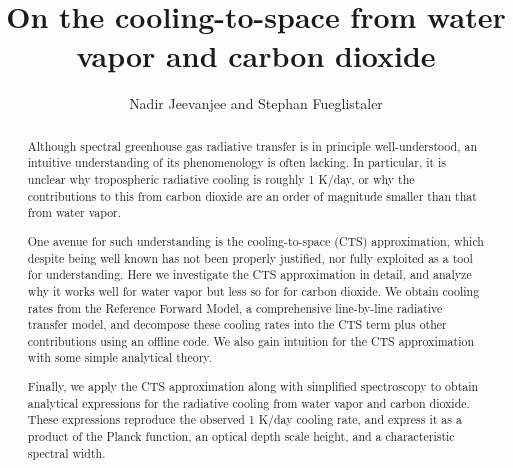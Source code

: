 \documentclass[10pt]{article}
\begin{document}
%
%


\title{On the cooling-to-space from water vapor and carbon dioxide}

%
%


 \author{Nadir Jeevanjee and Stephan Fueglistaler}

\maketitle

\begin{abstract}
Although spectral greenhouse gas radiative transfer is in principle well-understood, an intuitive understanding of its phenomenology is often lacking. In particular, it is unclear why tropospheric radiative cooling is roughly 1 K/day, or why the contributions to this from carbon dioxide are an order of magnitude smaller than that from water vapor.

One avenue for such understanding is the cooling-to-space (CTS) approximation, which despite being well known has not been properly justified, nor fully exploited as a tool for understanding. Here we investigate the CTS approximation in detail, and analyze why it works well for water vapor but less so for for carbon dioxide. We obtain cooling rates from the Reference Forward Model, a comprehensive line-by-line radiative transfer model, and decompose these cooling rates into the CTS term plus other contributions using an offline code. We also gain intuition for the CTS approximation with some simple analytical theory.

Finally, we apply the CTS approximation along with simplified spectroscopy to obtain analytical expressions for the radiative cooling from water vapor and carbon dioxide. These expressions reproduce the observed 1 K/day cooling rate, and express it as a product of the Planck function, an optical depth scale height, and a characteristic spectral width.



%
%
\end{abstract}


%
%
\end{document}
